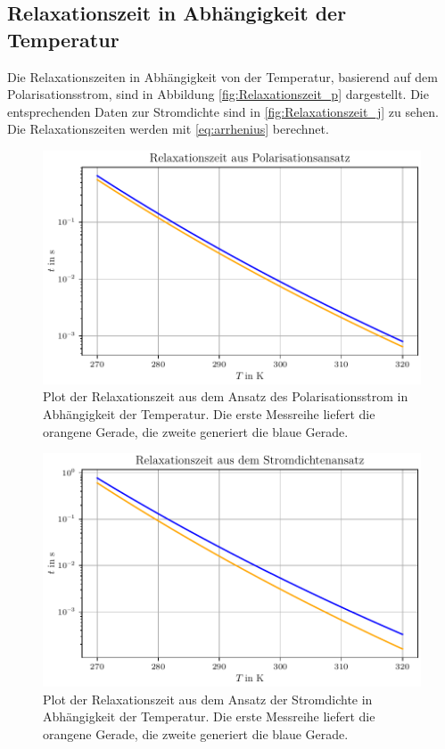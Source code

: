\subsection{Relaxationszeit in Abhängigkeit der Temperatur}
Die Relaxationszeiten in Abhängigkeit von der Temperatur, basierend auf dem Polarisationsstrom,
sind in Abbildung \autoref{fig:Relaxationszeit_p} dargestellt. Die entsprechenden Daten zur Stromdichte sind in \autoref{fig:Relaxationszeit_j} zu sehen.
Die Relaxationszeiten werden mit \autoref{eq:arrhenius} berechnet.

\begin{figure}[H]
    \centering
    \includegraphics[width=\textwidth]{plots/I_relaxationszeit_polarisation.pdf}
    \caption{Plot der Relaxationszeit aus dem Ansatz des Polarisationsstrom in Abhängigkeit der Temperatur.
    Die erste Messreihe liefert die orangene Gerade, die zweite generiert die blaue Gerade.}
    \label{fig:Relaxationszeit_p}
\end{figure}

\begin{figure}[H]
    \centering
    \includegraphics[width=\textwidth]{plots/J_relaxationszeit_stromdichte.pdf}
    \caption{Plot der Relaxationszeit aus dem Ansatz der Stromdichte in Abhängigkeit der Temperatur.
    Die erste Messreihe liefert die orangene Gerade, die zweite generiert die blaue Gerade.}
    \label{fig:Relaxationszeit_j}
\end{figure}